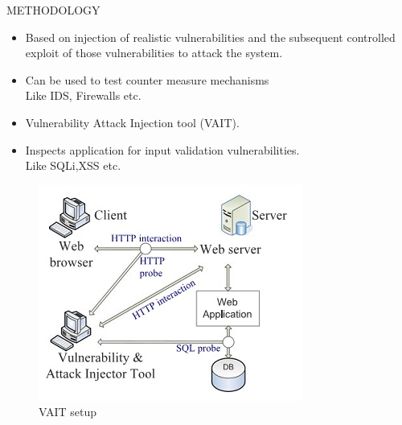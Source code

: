 \documentclass[xcolor=x11names,compress]{beamer}
\renewcommand{\(}{\begin{columns}}
\renewcommand{\)}{\end{columns}}
\newcommand{\<}[1]{\begin{column}{#1}}
\renewcommand{\>}{\end{column}}
\begin{document}
\begin{frame}{METHODOLOGY}
\begin{itemize}
	\item Based on injection of realistic vulnerabilities and the
	subsequent controlled exploit of those vulnerabilities to attack the system.
	\newline
	\item Can be  used to test counter measure mechanisms\\
	Like IDS, Firewalls etc.
	\newline
	\item Vulnerability Attack Injection tool (VAIT).
	\newline
	\item Inspects application for input validation vulnerabilities.\\
	Like SQLi,XSS etc.
\end{itemize}
\end{frame}
\begin{frame}

\begin{figure}
\centering
\includegraphics[width=0.7\linewidth]{Main/Fig2}
\caption{VAIT setup}
\label{fig:Fig2}
\end{figure}

\end{frame}
\end{document}
